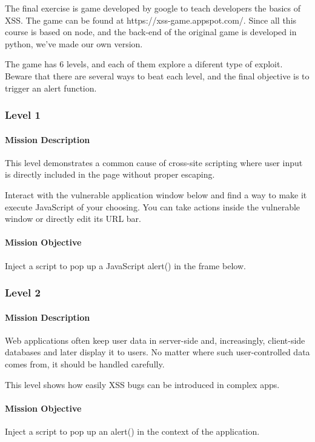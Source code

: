 
\begin{Exercise}[label={websec-xss-game}]
	The final exercise is game developed by google to teach developers the basics of XSS. The game can be found at https://xss-game.appspot.com/. Since all this course is based on node, and the back-end of the original game is developed in python, we've made our own version. 
	
	The game has 6 levels, and each of them explore a diferent type of exploit. Beware that there are several ways to beat each level, and the final objective is to trigger an alert function.
	
	\subsubsection{Level 1}
	\paragraph{Mission Description}
	This level demonstrates a common cause of cross-site scripting where user input is directly included in the page without proper escaping. 
	
	Interact with the vulnerable application window below and find a way to make it execute JavaScript of your choosing. You can take actions inside the vulnerable window or directly edit its URL bar.
	\paragraph{Mission Objective}
	Inject a script to pop up a JavaScript alert() in the frame below. 

	\subsubsection{Level 2}
		\paragraph{Mission Description}
		Web applications often keep user data in server-side and, increasingly, client-side databases and later display it to users. No matter where such user-controlled data comes from, it should be handled carefully. 
		
		This level shows how easily XSS bugs can be introduced in complex apps.
		\paragraph{Mission Objective}
		Inject a script to pop up an alert() in the context of the application. 
	

\end{Exercise}
